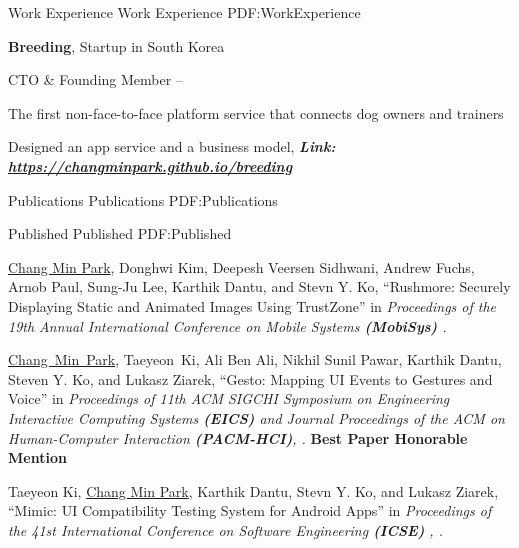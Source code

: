 \documentclass[letterpaper,MMMyyyy,nonstopmode]{simpleresumecv}
\begin{document}
\begin{Body}
\vspace{-0.7ex}
\Section
{Work Experience}
{Work Experience}
{PDF:WorkExperience}

\Entry
\textbf{Breeding}, Startup in South Korea

\Gap
\BulletItem
CTO \& Founding Member
\hfill
{} --

\Gap
\BulletItem
The first non-face-to-face platform service that connects dog owners and trainers
\hfill

\Gap
\BulletItem
Designed an app service and a business model, 
\textbf{\textit{Link: \href{https://changminpark.github.io/breeding}
{https://changminpark.github.io/breeding}}}




\vspace{-0.5ex}
\Section
{Publications}
{Publications}
{PDF:Publications}


\SubSection
{Published}
{Published}
{PDF:Published}

\begingroup
\renewcommand{\MaxNumberedItem}{[88]}

\Gap
\NumberedItem{[1]}
\underline{Chang Min Park}, Donghwi Kim, Deepesh Veersen Sidhwani, Andrew Fuchs, Arnob Paul,
Sung-Ju Lee, Karthik Dantu, and Stevn Y. Ko,
``Rushmore: Securely Displaying Static and Animated Images Using TrustZone'' in
\textit{Proceedings of the 19th Annual International Conference on Mobile Systems \textbf{(MobiSys)}
.}


\Gap
\vspace{0.5ex}
\NumberedItem{[2]} 
\underline{Chang~Min~Park}, Taeyeon~Ki, Ali Ben Ali, 
Nikhil Sunil Pawar, Karthik Dantu, Steven Y. Ko, and Lukasz Ziarek, 
``Gesto: Mapping UI Events to Gestures and Voice'' in
\textit{Proceedings of 11th ACM SIGCHI Symposium on Engineering Interactive Computing Systems \textbf{(EICS)}
and \textit{Journal Proceedings of the ACM on Human-Computer Interaction \textbf{(PACM-HCI)}}, .}
\linebreak\textbf{Best Paper Honorable Mention}

\Gap
\vspace{0.5ex}
\NumberedItem{[3]}
Taeyeon Ki, \underline{Chang Min Park}, Karthik Dantu, Stevn Y. Ko, and Lukasz Ziarek, 
``Mimic: UI Compatibility Testing System for Android Apps'' in
\textit{Proceedings of the 41st International Conference on Software Engineering \textbf{(ICSE)}
, .}


\end{Body}
\end{document}
